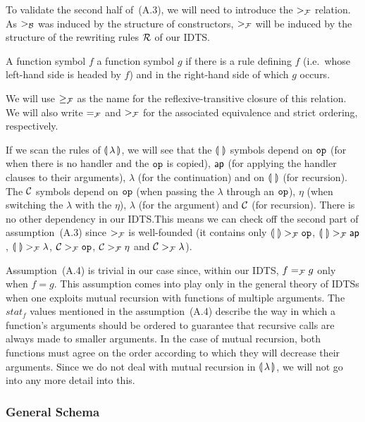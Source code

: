To validate the second half of~(A.3), we will need to introduce the $>_{\mathcal{F}}$
relation. As $>_{\mathcal{B}}$ was induced by the structure of constructors, $>_{\mathcal{F}}$
will be induced by the structure of the rewriting rules $\mathcal{R}$ of our IDTS.

\begin{definition}
  A function symbol $f$  a function symbol $g$ if there
  is a rule defining $f$ (i.e.\ whose left-hand side is headed by $f$) and
  in the right-hand side of which $g$ occurs.

  We will use $\ge_{\mathcal{F}}$ as the name for the reflexive-transitive closure of
  this relation. We will also write $=_{\mathcal{F}}$ and $>_{\mathcal{F}}$ for the associated
  equivalence and strict ordering, respectively.
\end{definition}

If we scan the rules of $\llparenthesis \, \lambda \, \rrparenthesis$, we will see that the
$\llparenthesis \,  \, \rrparenthesis$ symbols depend on $\mathtt{op}$ (for when there is no handler and
the $\mathtt{op}$ is copied), $\mathsf{ap}$ (for applying the handler clauses to their
arguments), $\lambda$ (for the continuation) and on $\llparenthesis \,  \, \rrparenthesis$ (for
recursion). The $\mathcal{C}$ symbols depend on $\mathtt{op}$ (when passing the
$\lambda$ through an $\mathtt{op}$), $\eta$ (when switching the $\lambda$ with
the $\eta$), $\lambda$ (for the argument) and $\mathcal{C}$ (for recursion). There
is no other dependency in our IDTS.\@ This means we can check off the
second part of assumption~(A.3) since $>_{\mathcal{F}}$ is well-founded (it contains
only $\llparenthesis \,  \, \rrparenthesis >_{\mathcal{F}} \mathtt{op}$, $\llparenthesis \,  \, \rrparenthesis >_{\mathcal{F}} \mathsf{ap}$,
$\llparenthesis \,  \, \rrparenthesis >_{\mathcal{F}} \lambda$, $\mathcal{C} >_{\mathcal{F}} \mathtt{op}$, $\mathcal{C} >_{\mathcal{F}} \eta$ and
$\mathcal{C} >_{\mathcal{F}} \lambda$).

Assumption~(A.4) is trivial in our case since, within our IDTS, $f =_{\mathcal{F}} g$
only when $f = g$. This assumption comes into play only in the general
theory of IDTSs when one exploits mutual recursion with functions of
multiple arguments. The $stat_f$ values mentioned in the assumption~(A.4)
describe the way in which a function's arguments should be ordered to
guarantee that recursive calls are always made to smaller arguments. In the
case of mutual recursion, both functions must agree on the order according
to which they will decrease their arguments. Since we do not deal with
mutual recursion in $\llparenthesis \, \lambda \, \rrparenthesis$, we will not go into any more detail
into this.


\subsubsection{General Schema}

